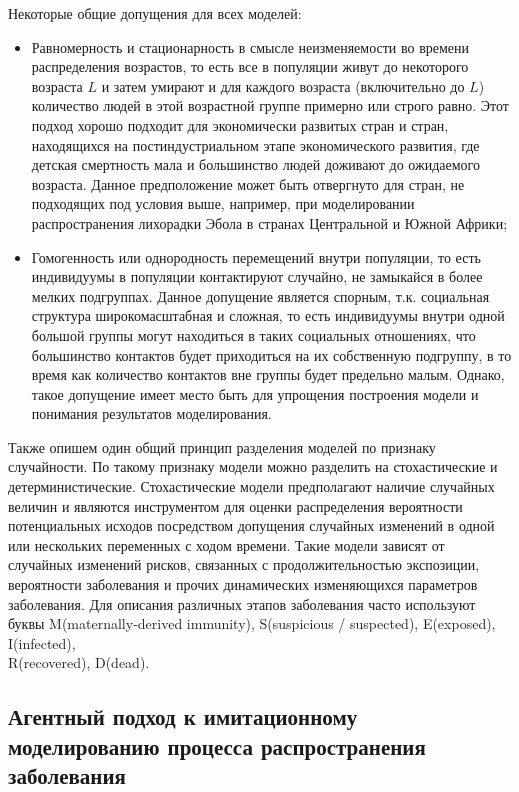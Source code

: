 Некоторые общие допущения для всех моделей:
\begin{itemize}
	\item Равномерность и стационарность в смысле неизменяемости во времени  распределения возрастов, то есть все в популяции живут до некоторого возраста $\mathit{L}$ и затем умирают и для каждого возраста (включительно до $\mathit{L}$) количество людей в этой возрастной группе примерно или строго равно. Этот подход хорошо подходит для экономически развитых стран и стран, находящихся на постиндустриальном этапе экономического развития, где детская смертность мала и большинство людей доживают до ожидаемого возраста. Данное предположение может быть отвергнуто для стран, не подходящих под условия выше, например, при моделировании распространения лихорадки Эбола в странах Центральной и Южной Африки;
	\item Гомогенность или однородность перемещений внутри популяции, то есть индивидуумы  в популяции контактируют случайно, не замыкайся в более мелких подгруппах. Данное допущение является спорным, т.к. социальная структура широкомасштабная и сложная, то есть индивидуумы внутри одной большой группы могут находиться в таких социальных отношениях, что большинство контактов будет приходиться на их собственную подгруппу, в то время как количество контактов вне группы будет предельно малым. Однако, такое допущение имеет место быть для упрощения построения модели   и понимания результатов моделирования.
\end{itemize}


Также опишем один общий принцип разделения моделей по признаку случайности. По такому признаку  модели можно разделить на стохастические и детерминистические. Стохастические модели предполагают наличие случайных величин  и являются инструментом для оценки распределения вероятности потенциальных исходов  посредством допущения случайных изменений в одной или нескольких переменных с ходом времени. Такие модели зависят от случайных изменений рисков, связанных с продолжительностью экспозиции, вероятности заболевания и прочих динамических изменяющихся параметров заболевания. Для описания различных этапов заболевания часто используют буквы M(maternally-derived immunity), S(suspicious / suspected), E(exposed), I(infected),  \\ R(recovered), D(dead).

\subsection{Агентный подход к имитационному моделированию процесса распространения заболевания}

